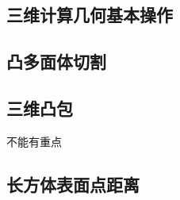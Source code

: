\documentclass[landscape, twocolumn, 8pt, a4paper, twoside]{extarticle}
\begin{document}

  \subsection{三维计算几何基本操作}
    

  \subsection{凸多面体切割}
    

  \subsection{三维凸包}
    不能有重点
    

%    
    
  \subsection{长方体表面点距离}
    
\end{document}
